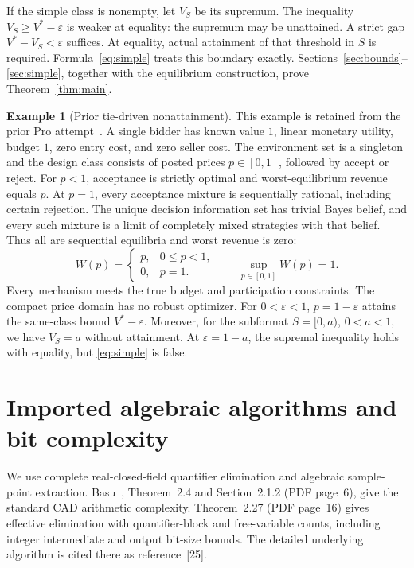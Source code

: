 \documentclass[11pt,a4paper]{article}
\numberwithin{equation}{section}
\theoremstyle{definition}
\newtheorem{example}[theorem]{Example}
\begin{document}
If the simple class is nonempty, let \(V_S\) be its supremum.
The inequality \(V_S\ge V^*-\varepsilon\) is weaker at equality:
the supremum may be unattained.
A strict gap \(V^*-V_S<\varepsilon\) suffices.
At equality, actual attainment of that threshold in \(S\) is required.
Formula~\eqref{eq:simple} treats this boundary exactly.
Sections~\ref{sec:bounds}--\ref{sec:simple}, together with the
equilibrium construction, prove Theorem~\ref{thm:main}.

\begin{example}[Prior tie-driven nonattainment]\label{ex:nonattainment}
This example is retained from the prior Pro attempt~\cite{PriorPro}.
A single bidder has known value \(1\), linear monetary utility, budget
\(1\), zero entry cost, and zero seller cost.
The environment set is a singleton and the design class consists of
posted prices \(p\in[0,1]\), followed by accept or reject.
For \(p<1\), acceptance is strictly optimal and worst-equilibrium
revenue equals \(p\).
At \(p=1\), every acceptance mixture is sequentially rational,
including certain rejection.
The unique decision information set has trivial Bayes belief, and
every such mixture is a limit of completely mixed strategies with
that belief. Thus all are sequential equilibria and worst revenue is zero:
\[
 W(p)=
 \begin{cases}p,&0\le p<1,\\0,&p=1.\end{cases}
 \qquad \sup_{p\in[0,1]}W(p)=1.
\]
Every mechanism meets the true budget and participation constraints.
The compact price domain has no robust optimizer.
For \(0<\varepsilon<1\), \(p=1-\varepsilon\) attains the
same-class bound \(V^*-\varepsilon\).
Moreover, for the subformat \(S=[0,a)\), \(0<a<1\), we have
\(V_S=a\) without attainment.
At \(\varepsilon=1-a\), the supremal inequality holds with equality,
but \eqref{eq:simple} is false.
\end{example}

\section{Imported algebraic algorithms and bit complexity}\label{sec:complexity}
We use complete real-closed-field quantifier elimination and algebraic
sample-point extraction.
Basu~\cite{Basu2014}, Theorem~2.4 and Section~2.1.2 (PDF page~6),
give the standard CAD arithmetic complexity.
Theorem~2.27 (PDF page~16) gives effective
elimination with quantifier-block and free-variable counts, including
integer intermediate and output bit-size bounds.
The detailed underlying algorithm is cited there as reference~[25].
\end{document}
